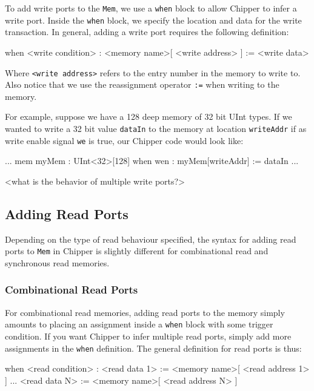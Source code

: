 To add write ports to the \verb+Mem+, we use a \verb+when+ block to allow Chipper to infer a write port. Inside the \verb+when+ block, we specify the location and data for the write transaction. In general, adding a write port requires the following definition:

\begin{stanza}
when <write condition> :
  <memory name>[ <write address> ] := <write data>
\end{stanza}

Where \verb+<write address>+ refers to the entry number in the memory to write to. Also notice that we use the reassignment operator \verb+:=+ when writing to the memory. 


For example, suppose we have a 128 deep memory of 32 bit UInt types. If we wanted to write a 32 bit value \verb+dataIn+ to the memory at location \verb+writeAddr+ if as write enable signal \verb+we+ is true, our Chipper code would look like:

\begin{stanza}
...
mem myMem : UInt<32>[128]
when wen :
  myMem[writeAddr] := dataIn
...
\end{stanza}

<what is the behavior of multiple write ports?>

\subsection{Adding Read Ports}

Depending on the type of read behaviour specified, the syntax for adding read ports to \verb+Mem+ in Chipper is slightly different for combinational read and synchronous read memories.

\subsubsection{Combinational Read Ports}

For combinational read memories, adding read ports to the memory simply amounts to placing an assignment inside a \verb+when+ block with some trigger condition. If you want Chipper to infer multiple read ports, simply add more assignments in the \verb+when+ definition. The general definition for read ports is thus:

\begin{stanza}
when <read condition> :
  <read data 1> := <memory name>[ <read address 1> ]
  ...
  <read data N> := <memory name>[ <read address N> ]
\end{stanza}

